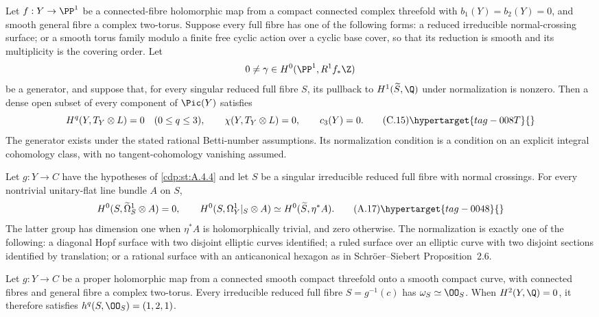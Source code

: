 \begin{proposition}\hypertarget{tag-01FK}{}\label{cdp:st:C4a}


Let $f:Y\to\PP^1$ be a connected-fibre holomorphic map from a compact connected complex threefold with $b_1(Y)=b_2(Y)=0$, and smooth general fibre a complex two-torus. Suppose every full fibre has one of the following forms: a reduced irreducible normal-crossing surface; or a smooth torus family modulo a finite free cyclic action over a cyclic base cover, so that its reduction is smooth and its multiplicity is the covering order. Let
\[
 0\ne\gamma\in H^0(\PP^1,R^1f_*\Z)
\]
be a generator, and suppose that, for every singular reduced full fibre $S$, its pullback to $H^1(\widetilde S,\Q)$ under normalization is nonzero. Then a dense open subset of every component of $\Pic(Y)$ satisfies
\[
 H^q(Y,T_Y\otimes L)=0\quad(0\le q\le3),\qquad
 \chi(Y,T_Y\otimes L)=0,\qquad c_3(Y)=0.                \tag{C.15}\hypertarget{tag-008T}{}\label{cdp:eq:C.15}
\]
The generator exists under the stated rational Betti-number assumptions. Its normalization condition is a condition on an explicit integral cohomology class, with no tangent-cohomology vanishing assumed.
\end{proposition}

\begin{proposition}\hypertarget{tag-01AU}{}\label{cdp:st:A.4.5}


Let $g:Y\to C$ have the hypotheses of \ref{cdp:st:A.4.4} and let $S$ be a singular irreducible reduced full fibre with normal crossings. For every nontrivial unitary-flat line bundle $A$ on $S$,
\[
H^0(S,\widetilde\Omega_S^1\otimes A)=0,
\qquad
H^0(S,\Omega_Y^1|_S\otimes A)
 \simeq H^0(\widetilde S,\eta^*A).
\tag{A.17}\hypertarget{tag-0048}{}\label{cdp:eq:A.17}
\]
The latter group has dimension one when $\eta^*A$ is holomorphically trivial, and zero otherwise. The normalization is exactly one of the following: a diagonal Hopf surface with two disjoint elliptic curves identified; a ruled surface over an elliptic curve with two disjoint sections identified by translation; or a rational surface with an anticanonical hexagon as in Schr\"oer--Siebert Proposition~2.6.
\end{proposition}

\begin{proposition}\hypertarget{tag-01AT}{}\label{cdp:st:A.4.4}


Let $g:Y\to C$ be a proper holomorphic map from a connected smooth compact threefold onto a smooth compact curve, with connected fibres and general fibre a complex two-torus. Every irreducible reduced full fibre $S=g^{-1}(c)$ has $\omega_S\simeq\OO_S$. When $H^2(Y,\Q)=0$, it therefore satisfies $h^q(S,\OO_S)=(1,2,1)$.
\end{proposition}

